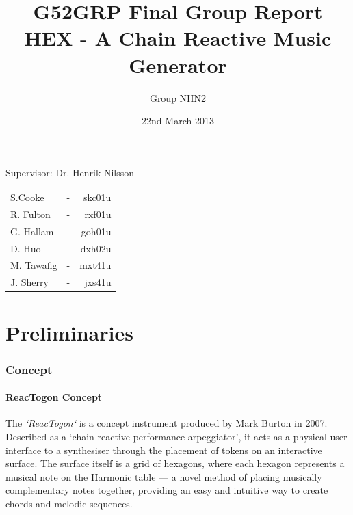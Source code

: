 \documentclass[10pt,a4paper]{article}
\begin{document}
\begin{titlepage}
\title{G52GRP Final Group Report\\HEX - A Chain Reactive Music Generator }
\author{Group NHN2}
\date{22nd March 2013}
\maketitle
\thispagestyle{empty}
\begin{center}
Supervisor: Dr. Henrik Nilsson\\
\bigskip
\begin{tabular}{ l c r }
  S.Cooke & - & skc01u \\
  R. Fulton & - & rxf01u \\
  G. Hallam & - & goh01u \\
  D. Huo & - & dxh02u \\
  M. Tawafig & - & mxt41u \\
  J. Sherry & - & jxs41u \\  
\end{tabular}
\end{center}
\end{titlepage}

\tableofcontents
\pagebreak

\part{Preliminaries}
\section{Concept}
\subsection{ReacTogon Concept}
The \textit{`ReacTogon`}\cite{modin} is a concept instrument produced by Mark Burton in 2007. Described as a `chain-reactive performance arpeggiator', it acts as a physical user interface to a synthesiser through the placement of tokens on an interactive surface. The surface itself is a grid of hexagons, where each hexagon represents a musical note on the Harmonic table\cite{wikipediaHarmTab} --- a novel method of placing musically complementary notes together, providing an easy and intuitive way to create chords and melodic sequences.\\
\end{document}
